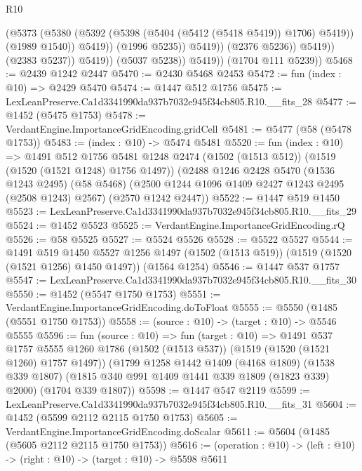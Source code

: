 \begin{lexlean}{R10}
\begin{coremodule}
                                (@5373
                                  (@5380
                                    (@5392 (@5398 (@5404 (@5412 (@5418 @5419)) @1706) @5419))
                                    (@1989 @1540))
                                  @5419))
                              (@1996 @5235))
                            @5419))
                        (@2376 @5236))
                      @5419))
                  (@2383 @5237))
                @5419))
            (@5037 @5238))
          @5419))
      (@1704 @111 @5239))
@5468 := @2439 @1242 @2447
@5470 := @2430 @5468 @2453
@5472 := fun (index : @10) => @2429 @5470
@5474 := @1447 @512 @1756
@5475 := LexLeanPreserve.Ca1d3341990da937b7032e945f34cb805.R10.__fits_28
@5477 := @1452 (@5475 @1753)
@5478 := VerdantEngine.ImportanceGridEncoding.gridCell
@5481 := @5477 (@58 (@5478 @1753))
@5483 := (index : @10) -> @5474 @5481
@5520 := fun (index : @10) =>
  @1491
    @512
    @1756
    @5481
    @1248
    @2474
    (@1502 (@1513 @512))
    (@1519 (@1520 (@1521 @1248) @1756 @1497))
    (@2488
      @1246
      @2428
      @5470
      (@1536 @1243 @2495)
      (@58 @5468)
      (@2500 @1244 @1096 @1409 @2427 @1243 @2495 (@2508 @1243) @2567)
      (@2570 @1242 @2447))
@5522 := @1447 @519 @1450
@5523 := LexLeanPreserve.Ca1d3341990da937b7032e945f34cb805.R10.__fits_29
@5524 := @1452 @5523
@5525 := VerdantEngine.ImportanceGridEncoding.rQ
@5526 := @58 @5525
@5527 := @5524 @5526
@5528 := @5522 @5527
@5544 := @1491
    @519
    @1450
    @5527
    @1256
    @1497
    (@1502 (@1513 @519))
    (@1519 (@1520 (@1521 @1256) @1450 @1497))
    (@1564 @1254)
@5546 := @1447 @537 @1757
@5547 := LexLeanPreserve.Ca1d3341990da937b7032e945f34cb805.R10.__fits_30
@5550 := @1452 (@5547 @1750 @1753)
@5551 := VerdantEngine.ImportanceGridEncoding.doToFloat
@5555 := @5550 (@1485 (@5551 @1750 @1753))
@5558 := (source : @10) -> (target : @10) -> @5546 @5555
@5596 := fun (source : @10) =>
  fun (target : @10) =>
  @1491
    @537
    @1757
    @5555
    @1260
    @1786
    (@1502 (@1513 @537))
    (@1519 (@1520 (@1521 @1260) @1757 @1497))
    (@1799
      @1258
      @1442
      @1409
      (@4168 @1809)
      (@1538 @339 @1807)
      (@1815 @340 @991 @1409 @1441 @339 @1809 (@1823 @339) @2000)
      (@1704 @339 @1807))
@5598 := @1447 @547 @2119
@5599 := LexLeanPreserve.Ca1d3341990da937b7032e945f34cb805.R10.__fits_31
@5604 := @1452 (@5599 @2112 @2115 @1750 @1753)
@5605 := VerdantEngine.ImportanceGridEncoding.doScalar
@5611 := @5604 (@1485 (@5605 @2112 @2115 @1750 @1753))
@5616 := (operation : @10) -> (left : @10) -> (right : @10) -> (target : @10) -> @5598 @5611

\end{coremodule}
\end{lexlean}
